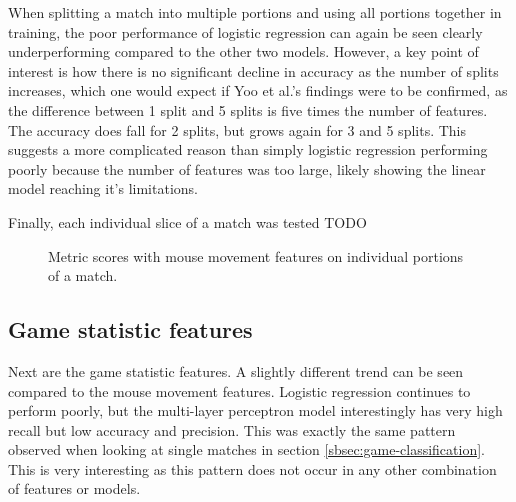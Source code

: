 \documentclass[Report.tex]{subfiles}
\newcommand{\lineaxis}[5]{
\begin{axis}[
    title={#1},
    width=#3,
    height=#4,
    legend style={at={#5},anchor=north,legend columns=-1},
    enlarge x limits=0.4,
	xlabel={Portion of match},
    ylabel={#2},
]
}
\newcommand{\plotline}[4]{
\addplot+[
	discard if not={numSplits}{5},
	discard if not={model}{#1},
	discard if not={features}{#2}
] table [x=split, y=#3, col sep=comma] {data/19-pair-cv.csv};
\addlegendentry{#4}
}
\begin{document}
When splitting a match into multiple portions and using all portions together in training, the poor performance of logistic regression can again be seen clearly underperforming compared to the other two models. However, a key point of interest is how there is no significant decline in accuracy as the number of splits increases, which one would expect if Yoo et al.'s \cite{lr-vs-rf} findings were to be confirmed, as the difference between 1 split and 5 splits is five times the number of features. The accuracy does fall for 2 splits, but grows again for 3 and 5 splits. This suggests a more complicated reason than simply logistic regression performing poorly because the number of features was too large, likely showing the linear model reaching it's limitations. 


Finally, each individual slice of a match was tested TODO

\begin{figure}[H]
\centering
{}
\caption{Metric scores with mouse movement features on individual portions of a match. }
\end{figure}

\subsection{Game statistic features}
Next are the game statistic features. A slightly different trend can be seen compared to the mouse movement features. Logistic regression continues to perform poorly, but the multi-layer perceptron model interestingly has very high recall but low accuracy and precision. This was exactly the same pattern observed when looking at single matches in section \ref{sbsec:game-classification}. This is very interesting as this pattern does not occur in any other combination of features or models. 

\end{document}

